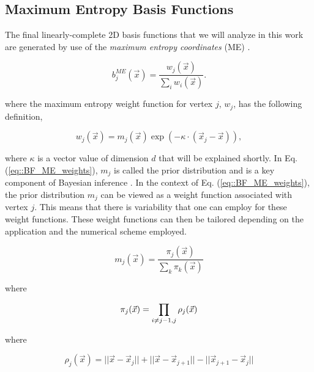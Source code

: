 \subsection{Maximum Entropy Basis Functions}
\label{sec::BF_2DLinear_ME}

The final linearly-complete 2D basis functions that we will analyze in this work are generated by use of the {\em maximum entropy coordinates} (ME) \cite{sukumar2004construction,arroyo2006local,hormann2008maximum}. 

\begin{equation}
\label{eq::BF_ME_BF}
b_{j}^{ME} (\vec{x}) = \frac{w_j (\vec{x}) }{\sum_i w_i (\vec{x})} .
\end{equation}

\noindent where the maximum entropy weight function for vertex $j$, $w_j$, has the following definition,

\begin{equation}
\label{eq::BF_ME_weights}
w_j (\vec{x})  = m_j(\vec{x}) \exp(-  \kappa \cdot (\vec{x}_j - \vec{x})),
\end{equation}

\noindent where $\kappa$ is a vector value of dimension $d$ that will be explained shortly. In Eq. (\ref{eq::BF_ME_weights}), $m_j$ is called the prior distribution and is a key component of Bayesian inference \cite{kullback1951information,jaynes1963information}. In the context of Eq. (\ref{eq::BF_ME_weights}), the prior distribution $m_j$ can be viewed as a weight function associated with vertex $j$. This means that there is variability that one can employ for these weight functions. These weight functions can then be tailored depending on the application and the numerical scheme employed. 

\begin{equation}
\label{eq::BF_ME_prior_funcs}
 m_j(\vec{x}) = \frac{\pi_j (\vec{x}) }{\sum_{k} \pi_k (\vec{x})}
\end{equation}

\noindent where

\begin{equation}
\label{eq::BF_ME_prior_products}
\pi_j (\vec{x}) = \prod\displaylimits_{i \neq j-1, j} \rho_j (\vec{x})
\end{equation}

\noindent where

\begin{equation}
\label{eq::BF_ME_face_funcs}
\rho_j (\vec{x}) = || \vec{x} - \vec{x}_j || + || \vec{x} - \vec{x}_{j+1} || - || \vec{x}_{j+1} - \vec{x}_j ||
\end{equation}

